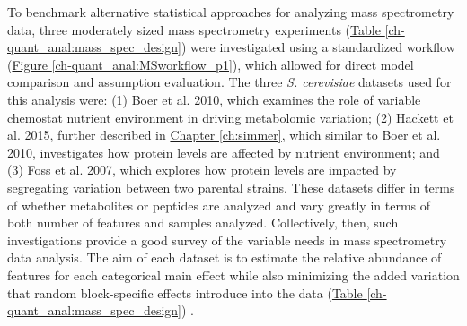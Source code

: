 To benchmark alternative statistical approaches for analyzing mass spectrometry data, three moderately sized mass spectrometry experiments (\hyperref[ch-quant_anal:mass_spec_design]{Table \ref{ch-quant_anal:mass_spec_design}}) were investigated using a standardized workflow (\hyperref[ch-quant_anal:MSworkflow_p1]{Figure \ref{ch-quant_anal:MSworkflow_p1}}), which allowed for direct model comparison and assumption evaluation.  The three \textit{S. cerevisiae} datasets used for this analysis were: (1) Boer et al. 2010, which examines the role of variable chemostat nutrient environment in driving metabolomic variation; (2) Hackett et al. 2015, further described in \hyperref[ch:simmer]{Chapter \ref{ch:simmer}}, which similar to Boer et al. 2010, investigates how protein levels are affected by nutrient environment; and (3) Foss et al. 2007, which explores how protein levels are impacted by segregating variation between two parental strains. These datasets differ in terms of whether metabolites or peptides are analyzed and vary greatly in terms of both number of features and samples analyzed. Collectively, then, such investigations provide a good survey of the variable needs in mass spectrometry data analysis. The aim of each dataset is to estimate the relative abundance of features for each categorical main effect while also minimizing the added variation that random block-specific effects introduce into the data (\hyperref[ch-quant_anal:mass_spec_design]{Table \ref{ch-quant_anal:mass_spec_design}}) \cite{Bates:2013vy}.

\begin{table}[h!]
\begin{center}
\caption[Summary of benchmark datasets]{Summary of benchmark datasets}
\label{ch-quant_anal:mass_spec_design}
\end{center}
\end{table}


